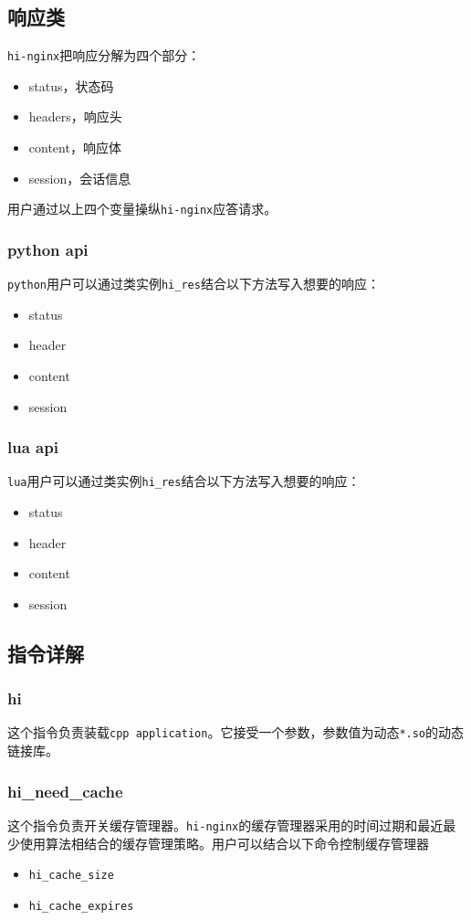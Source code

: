 \subsection{响应类}
\texttt{hi-nginx}把响应分解为四个部分：
\begin{itemize}
\item status，状态码
\item headers，响应头
\item content，响应体
\item session，会话信息
\end{itemize}
用户通过以上四个变量操纵\texttt{hi-nginx}应答请求。
\subsubsection{python api}
\texttt{python}用户可以通过类实例\texttt{hi_res}结合以下方法写入想要的响应：
\begin{itemize}
\item status
\item header
\item content
\item session
\end{itemize}
\subsubsection{lua api}
\texttt{lua}用户可以通过类实例\texttt{hi_res}结合以下方法写入想要的响应：
\begin{itemize}
\item status
\item header
\item content
\item session
\end{itemize}


\subsection{指令详解}
\subsubsection{hi}
这个指令负责装载\texttt{cpp application}。它接受一个参数，参数值为动态\texttt{*.so}的动态链接库。
\subsubsection{hi_need_cache}
这个指令负责开关缓存管理器。\texttt{hi-nginx}的缓存管理器采用的时间过期和最近最少使用算法相结合的缓存管理策略。用户可以结合以下命令控制缓存管理器
\begin{itemize}
\item \texttt{hi_cache_size}
\item \texttt{hi_cache_expires}
\end{itemize}
